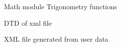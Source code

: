     \begin{figure}[h!]
      \centering
      \caption{Math module Trigonometry functions}
      \label{fig:Math trigonometry functions}
    \end{figure}
    \begin{figure}[h!]
      \centering
      \caption{DTD of xml file}
      \label{fig:dtd of the output xml file}
    \end{figure}
    \begin{figure}[h!]
      \centering
      \caption{XML file generated from user data}
      \label{fig:output xml file}
    \end{figure}
    \pagebreak

